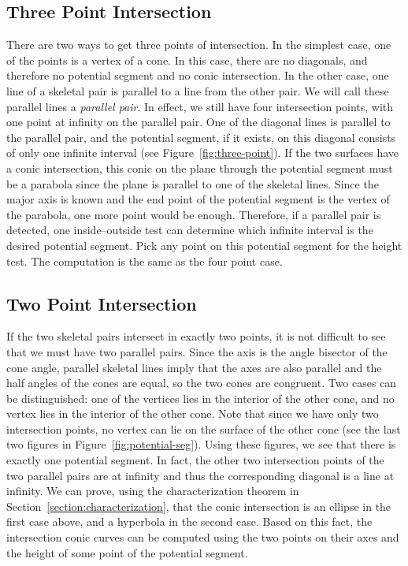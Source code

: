 \subsection{Three Point Intersection}
\label{section:three-point}
     There are two ways to get three points of intersection.  In the simplest 
case, one of the points is a vertex of a cone.  In this case, there are no
diagonals, and therefore no potential segment and no conic intersection.  In 
the other case, one line of a skeletal pair is parallel to a line from the 
other pair.  We will call these parallel lines a {\em parallel pair}.  In 
effect, we still have four intersection points, with one point at infinity on 
the parallel pair.  One of the diagonal lines is parallel to the parallel pair,
and the potential segment, if it exists, on this diagonal consists of only one
infinite interval (see Figure~\ref{fig:three-point}).  If the two surfaces have
a conic intersection, this conic on the plane through the potential segment 
must be a parabola since the plane is parallel to one of the skeletal lines.  
Since the major axis is known and the end point of the potential segment is the
vertex of the parabola, one more point would be enough.  Therefore, if a 
parallel pair is detected, one inside--outside test can determine which 
infinite interval is the desired potential segment.  Pick any point on this 
potential segment for the height test.  The computation is the same as the 
four point case.


\subsection{Two Point Intersection}
\label{section:two-point}
     If the two skeletal pairs intersect in exactly two points, it is not
difficult to see that we must have two parallel pairs.  Since the axis is the
angle bisector of the cone angle, parallel skeletal lines imply that the axes
are also parallel and the half angles of the cones are equal, 
so the two cones are congruent.
Two cases can be distinguished: one of the vertices lies 
in the interior of the 
other cone, and no vertex lies in the interior of the other cone.  Note that 
since we have only two intersection points, no vertex can lie on the surface of
the other cone (see the last two figures in Figure~\ref{fig:potential-seg}).
Using these figures, we see that there is exactly one potential segment.
In fact, the other two intersection points of the two parallel pairs are at 
infinity and thus the corresponding diagonal is a line at infinity.  We can 
prove, using the characterization theorem in 
Section~\ref{section:characterization}, that the conic intersection is an 
ellipse in the first case above, and a hyperbola in the second case.  Based on
this fact, the  intersection conic curves can be computed using the two points
on their axes and the height of some point of the potential segment.  

